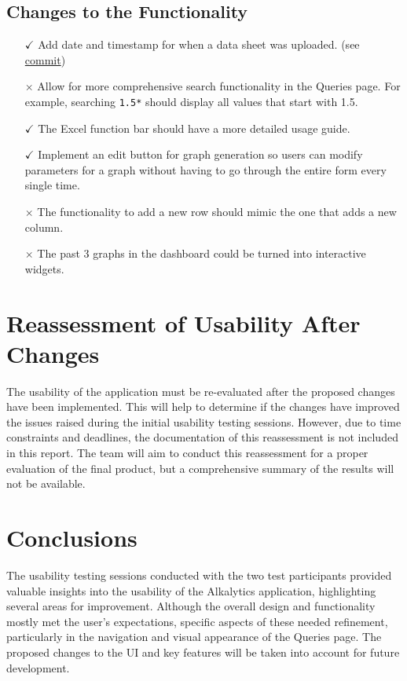 \documentclass{article}
\begin{document}
\subsection{Changes to the Functionality}
\begin{itemize}
    \item[$\checkmark$] Add date and timestamp for when a data sheet was
    uploaded. (see
    \href{https://github.com/SumanyaG/Alkalytics/commit/db5000a1cb3ff4bc0b9faedc4bab3176df5a1147}{commit})
    \item[$\times$] Allow for more comprehensive search functionality in the
    Queries page. For example, searching \texttt{1.5*} should display all values
    that start with 1.5.
    \item[$\checkmark$] The Excel function bar should have a more detailed usage guide.
    \item[$\checkmark$] Implement an edit button for graph generation so users
    can modify parameters for a graph without having to go through the entire
    form every single time.
    \item[$\times$] The functionality to add a new row should mimic the one that
    adds a new column.
    \item[$\times$] The past 3 graphs in the dashboard could be turned into
    interactive widgets.
\end{itemize}

\section{Reassessment of Usability After Changes}
The usability of the application must be re-evaluated after the proposed
changes have been implemented. This will help to determine if the changes have
improved the issues raised during the initial usability testing sessions.
However, due to time constraints and deadlines, the documentation of this
reassessment is not included in this report. The team will aim to conduct this
reassessment for a proper evaluation of the final product, but a comprehensive
summary of the results will not be available.

\section{Conclusions}
The usability testing sessions conducted with the two test participants provided
valuable insights into the usability of the Alkalytics application, highlighting
several areas for improvement. Although the overall design and functionality
mostly met the user's expectations, specific aspects of these needed refinement,
particularly in the navigation and visual appearance of the Queries page. The
proposed changes to the UI and key features will be taken into account for
future development.
\end{document}
